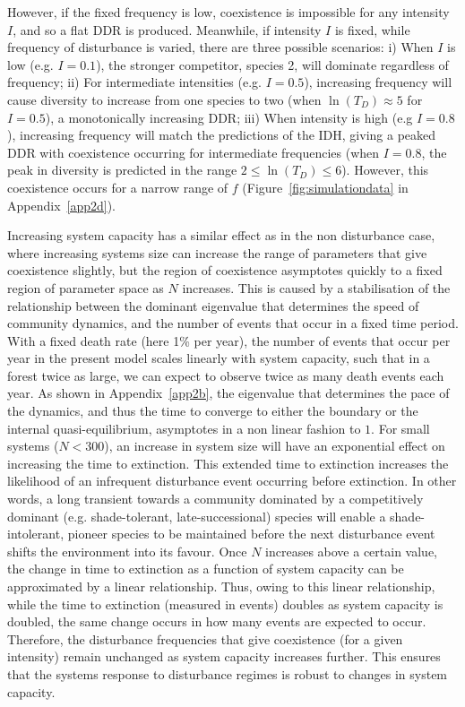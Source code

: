However, if the fixed frequency is low, coexistence is impossible for any intensity $I$, and so a flat DDR is produced. Meanwhile, if intensity $I$ is fixed, while frequency of disturbance is varied, there are three possible scenarios: i) When $I$ is low (e.g. $I=0.1$), the stronger competitor, species 2, will dominate regardless of frequency; ii) For intermediate intensities (e.g. $I=0.5$), increasing frequency will cause diversity to increase from one species to two (when $\ln(T_D)\approx 5$ for $I=0.5$), a monotonically increasing DDR; iii) When intensity is high (e.g $I=0.8$), increasing frequency will match the predictions of the IDH, giving a peaked DDR with coexistence occurring for intermediate frequencies (when $I=0.8$, the peak in diversity is predicted in the range $2\leq \ln(T_D) \leq 6$). However, this coexistence occurs for a narrow range of $f$ (Figure~\ref{fig:simulationdata} in Appendix~\ref{app2d}). 

Increasing system capacity has a similar effect as in the non disturbance case, where increasing systems size can increase the range of parameters that give coexistence slightly, but the region of coexistence asymptotes quickly to a fixed region of parameter space as $N$ increases. This is caused by a stabilisation of the relationship between the dominant eigenvalue that determines the speed of community dynamics, and the number of events that occur in a fixed time period. With a fixed death rate (here 1\% per year), the number of events that occur per year in the present model scales linearly with system capacity, such that in a forest twice as large, we can expect to observe twice as many death events each year. As shown in Appendix~\ref{app2b}, the eigenvalue that determines the pace of the dynamics, and thus the time to converge to either the boundary or the internal quasi-equilibrium, asymptotes in a non linear fashion to $1$. For small systems ($N<300$), an increase in system size will have an exponential effect on increasing the time to extinction. This extended time to extinction increases the likelihood of an infrequent disturbance event occurring before extinction. In other words, a long transient towards a community dominated by a competitively dominant (e.g. shade-tolerant, late-successional) species will enable a shade-intolerant, pioneer species to be maintained before the next disturbance event shifts the environment into its favour. Once $N$ increases above a certain value, the change in time to extinction as a function of system capacity can be approximated by a linear relationship. Thus, owing to this linear relationship, while the time to extinction (measured in events) doubles as system capacity is doubled, the same change occurs in how many events are expected to occur. Therefore, the disturbance frequencies that give coexistence (for a given intensity) remain unchanged as system capacity increases further. This ensures that the systems response to disturbance regimes is robust to changes in system capacity.

